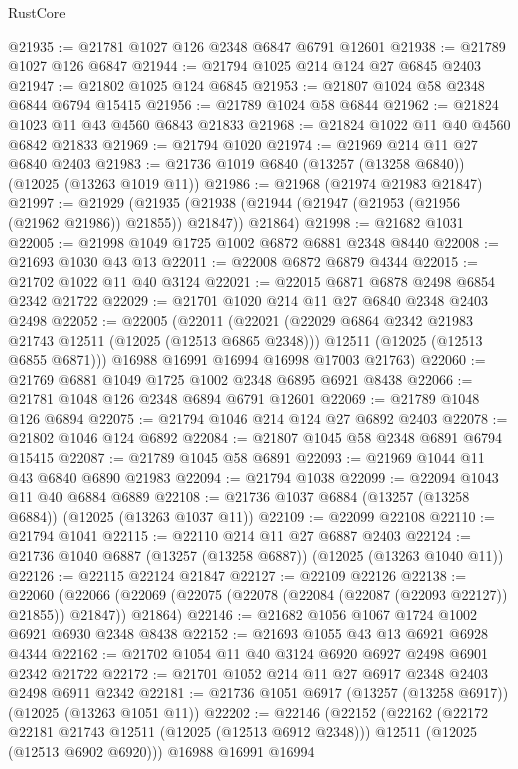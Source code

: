 \begin{lexlean}{RustCore}
\begin{coremodule}
@21935 := @21781 @1027 @126 @2348 @6847 @6791 @12601
@21938 := @21789 @1027 @126 @6847
@21944 := @21794 @1025 @214 @124 @27 @6845 @2403
@21947 := @21802 @1025 @124 @6845
@21953 := @21807 @1024 @58 @2348 @6844 @6794 @15415
@21956 := @21789 @1024 @58 @6844
@21962 := @21824 @1023 @11 @43 @4560 @6843 @21833
@21968 := @21824 @1022 @11 @40 @4560 @6842 @21833
@21969 := @21794 @1020
@21974 := @21969 @214 @11 @27 @6840 @2403
@21983 := @21736 @1019 @6840 (@13257 (@13258 @6840)) (@12025 (@13263 @1019 @11))
@21986 := @21968 (@21974 @21983 @21847)
@21997 := @21929
    (@21935 (@21938 (@21944 (@21947 (@21953 (@21956 (@21962 @21986)) @21855)) @21847)) @21864)
@21998 := @21682 @1031
@22005 := @21998 @1049 @1725 @1002 @6872 @6881 @2348 @8440
@22008 := @21693 @1030 @43 @13
@22011 := @22008 @6872 @6879 @4344
@22015 := @21702 @1022 @11 @40 @3124
@22021 := @22015 @6871 @6878 @2498 @6854 @2342 @21722
@22029 := @21701 @1020 @214 @11 @27 @6840 @2348 @2403 @2498
@22052 := @22005
    (@22011
      (@22021
        (@22029 @6864 @2342 @21983 @21743 @12511 (@12025 (@12513 @6865 @2348)))
        @12511
        (@12025 (@12513 @6855 @6871)))
      @16988
      @16991
      @16994
      @16998
      @17003
      @21763)
@22060 := @21769 @6881 @1049 @1725 @1002 @2348 @6895 @6921 @8438
@22066 := @21781 @1048 @126 @2348 @6894 @6791 @12601
@22069 := @21789 @1048 @126 @6894
@22075 := @21794 @1046 @214 @124 @27 @6892 @2403
@22078 := @21802 @1046 @124 @6892
@22084 := @21807 @1045 @58 @2348 @6891 @6794 @15415
@22087 := @21789 @1045 @58 @6891
@22093 := @21969 @1044 @11 @43 @6840 @6890 @21983
@22094 := @21794 @1038
@22099 := @22094 @1043 @11 @40 @6884 @6889
@22108 := @21736 @1037 @6884 (@13257 (@13258 @6884)) (@12025 (@13263 @1037 @11))
@22109 := @22099 @22108
@22110 := @21794 @1041
@22115 := @22110 @214 @11 @27 @6887 @2403
@22124 := @21736 @1040 @6887 (@13257 (@13258 @6887)) (@12025 (@13263 @1040 @11))
@22126 := @22115 @22124 @21847
@22127 := @22109 @22126
@22138 := @22060
    (@22066 (@22069 (@22075 (@22078 (@22084 (@22087 (@22093 @22127)) @21855)) @21847)) @21864)
@22146 := @21682 @1056 @1067 @1724 @1002 @6921 @6930 @2348 @8438
@22152 := @21693 @1055 @43 @13 @6921 @6928 @4344
@22162 := @21702 @1054 @11 @40 @3124 @6920 @6927 @2498 @6901 @2342 @21722
@22172 := @21701 @1052 @214 @11 @27 @6917 @2348 @2403 @2498 @6911 @2342
@22181 := @21736 @1051 @6917 (@13257 (@13258 @6917)) (@12025 (@13263 @1051 @11))
@22202 := @22146
    (@22152
      (@22162
        (@22172 @22181 @21743 @12511 (@12025 (@12513 @6912 @2348)))
        @12511
        (@12025 (@12513 @6902 @6920)))
      @16988
      @16991
      @16994

\end{coremodule}
\end{lexlean}
